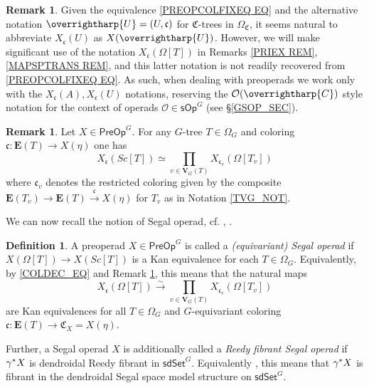 \documentclass[a4paper,10pt
,draft
]{article}%
\numberwithin{equation}{section}
\numberwithin{figure}{section}
\theoremstyle{definition} %
\newtheorem{definition}[equation]{Definition}%
\newtheorem{remark}[equation]{Remark}%
\newcommand{\vect}[1]{\text{\overrightharp{\ensuremath{#1}}}}
\newcommand{\sdSet}{\mathsf{sdSet}}
\renewcommand{\O}{\ensuremath{\mathcal O}}
\newcommand{\1}{\ensuremath{\mathbbm 1}}%
\begin{document}
\begin{remark}
	Given the equivalence \eqref{PREOPCOLFIXEQ EQ}
	and the alternative notation
	$\vect{U} = (U,\mathfrak{c})$
	for $\mathfrak{C}$-trees in $\Omega_{\mathfrak{C}}$, 
	it seems natural to abbreviate 
	$X_{\mathfrak{c}}(U)$ as $X(\vect{U})$.
	However, we will make significant use of the notation
	$X_{\mathfrak{c}}(\Omega[T])$
	in Remarks \ref{PRIEX REM}, \ref{MAPSPTRANS REM},
	and this latter notation is not readily recovered from 
	\eqref{PREOPCOLFIXEQ EQ}.
	As such, when dealing with preoperads we work only with the 
	$X_{\mathfrak{c}}(A),X_{\mathfrak{c}}(U)$
	notations,
	reserving the $\O(\vect{C})$ style notation for the context of operads 
	$\O \in \mathsf{sOp}^G$ (see \S \ref{GSOP_SEC}).
\end{remark}



\begin{remark}\label{SCTCOLPR REM}
	Let $X \in \mathsf{PreOp}^G$.
	For any $G$-tree $T \in \Omega_G$
	and coloring 
	$\mathfrak{c} \colon \boldsymbol{E}(T) \to X(\eta)$
	one has
	\[
                X_{\mathfrak{c}}(Sc[T]) 
                \simeq
                \prod_{v \in \boldsymbol{V}_G(T)}
                X_{\mathfrak{c}_v}(\Omega[T_v]) 
	\]
        where $\mathfrak{c}_v$
        denotes the restricted coloring given by the composite
        $\boldsymbol{E}(T_v) \to \boldsymbol{E}(T) 
        \xrightarrow{\mathfrak{c}} X(\eta)$
        for $T_v$ as in Notation \ref{TVG_NOT}.
\end{remark}


We can now recall the notion of 
Segal operad, 
cf. \cite[Def. 5.5]{CM13b}, \cite[Def. 4.40]{BP_edss}.

\begin{definition}\label{SEGCOLCHAR DEF}
	A preoperad $X \in \mathsf{PreOp}^G$ is called a \emph{(equivariant) Segal operad} if
	$X(\Omega[T]) \to 	X(Sc[T])$
	is a Kan equivalence for each $T \in \Omega_G$.
%
	Equivalently, by \eqref{COLDEC_EQ} %
	and Remark \ref{SCTCOLPR REM},
	this means that the natural maps
\begin{equation}\label{SEGCOLCHAR EQ}
	X_{\mathfrak{c}}(\Omega[T])
	\xrightarrow{\sim}
		\prod_{v \in \boldsymbol{V}_G(T)}
	X_{\mathfrak{c}_v}(\Omega[T_v])
\end{equation}
	are Kan equivalences for all 
	$T \in \Omega_G$
	and $G$-equivariant coloring
	$\mathfrak{c} \colon 
	\boldsymbol{E}(T) \to \mathfrak{C}_X = X(\eta)$.
	
	Further, a Segal operad $X$ is additionally called a
	\emph{Reedy fibrant Segal operad} 
	if $\gamma^{\**}X$ is dendroidal Reedy fibrant in $\sdSet^G$.
	Equivalently \cite[Rem. 4.41]{BP_edss},
	this means that $\gamma^{\**}X$ is fibrant in the dendroidal Segal space model structure on $\sdSet^G$.
\end{definition}
\end{document}
